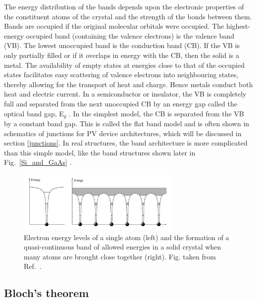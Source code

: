 \documentclass[11pt, twoside]{report}
\begin{document}
The energy distribution of the bands depends upon the electronic properties of the constituent atoms of the crystal and the strength of the bonds between them. Bands are occupied if the original molecular orbitals were occupied. The highest-energy occupied band (containing the valence electrons) is the valence band (VB). The lowest unoccupied band is the conduction band (CB). If the VB is only partially filled or if it overlaps in energy with the CB, then the solid is a metal. The availability of empty states at energies close to that of the occupied states facilitates easy scattering of valence electrons into neighbouring states, thereby allowing for the transport of heat and charge. Hence metals conduct both heat and electric current. In a semiconductor or insulator, the VB is completely full and separated from the next unoccupied CB by an energy gap called the optical band gap, E$_g$ \cite{Nelson3}. In the simplest model, the CB is separated from the VB by a constant band gap. This is called the flat band model and is often shown in schematics of junctions for PV device architectures, which will be discussed in section \ref{junctions}. In real structures, the band architecture is more complicated than this simple model, like the band structures shown later in Fig.~\ref{Si_and_GaAs} \cite{Tilley}.

\begin{figure}[h!]
  \centering
    \includegraphics[width=0.7\textwidth]{figures/band_Elevels.png}
    \caption[Electron energy levels of a single atom (left) and the formation of a quasi-continuous band of allowed energies in a solid crystal when many atoms are brought close together (right).]{Electron energy levels of a single atom (left) and the formation of a quasi-continuous band of allowed energies in a solid crystal when many atoms are brought close together (right). Fig. taken from Ref.~.}
  \label{band_Elevels}
\end{figure}

\subsection{Bloch's theorem}
\end{document}
